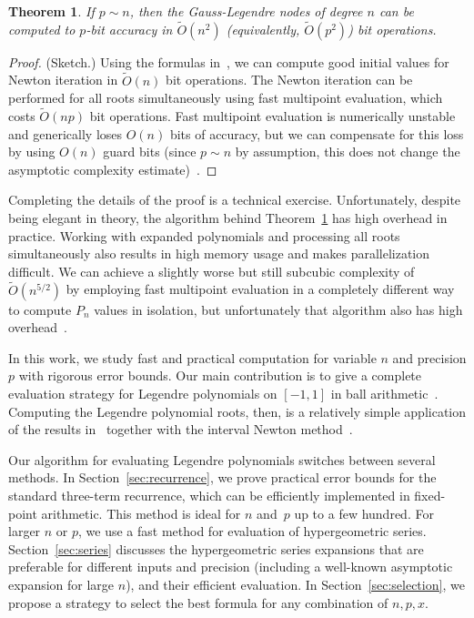 \documentclass[11pt,a4paper]{article}
\newtheorem{theorem}{Theorem}
\begin{document}
\begin{theorem}
\label{thm:complexity}
If $p \sim n$, then the Gauss-Legendre nodes of degree $n$ can be computed to
$p$-bit accuracy in $\widetilde{O}(n^2)$ (equivalently, $\widetilde{O}(p^2)$) bit operations.
\end{theorem}

\begin{proof}
(Sketch.)
Using the formulas in~\cite{petras1999computation},
we can compute good initial values for Newton iteration
in $\widetilde{O}(n)$ bit operations.
The Newton iteration can be performed for all roots
simultaneously using fast multipoint evaluation, which costs
$\widetilde{O}(n p)$ bit operations.
Fast multipoint evaluation is numerically unstable and
generically loses $O(n)$ bits of accuracy, but we can compensate for
this loss by using $O(n)$ guard bits
(since $p \sim n$ by assumption, this does not change the asymptotic complexity estimate)~\cite{kobel2013fast}.
\end{proof}

Completing the details
of the proof is a technical exercise.
Unfortunately, despite being elegant in theory,
the algorithm behind Theorem~\ref{thm:complexity} has high overhead
in practice. Working with expanded polynomials and
processing all roots simultaneously also results in high memory usage and
makes parallelization difficult.
We can achieve a slightly worse but still subcubic
complexity of $\widetilde{O}(n^{5/2})$
by employing
fast multipoint evaluation in a completely different way
to compute $P_n$ values in isolation,
but unfortunately that algorithm
also has high overhead~\cite{Johansson2014rectangular}.

In this work, we study fast and practical computation for variable $n$
and precision $p$ with rigorous error bounds.
Our main contribution is to give a complete evaluation strategy
for Legendre polynomials on $[-1,1]$ in ball arithmetic~\cite{vdH:ball,Johansson2017arb}.
Computing the Legendre polynomial roots, then,
is a relatively simple application of the results
in~\cite{petras1999computation} together with
the interval Newton method~\cite{moore1979methods}.

Our algorithm for evaluating Legendre polynomials switches between several methods.
In Section~\ref{sec:recurrence},
we prove practical error bounds for the standard three-term recurrence,
which can be efficiently implemented
in fixed-point arithmetic.
This method is ideal for $n$ and~$p$ up to a few hundred.
For larger $n$ or $p$, we use a fast method for evaluation
of hypergeometric series.
Section~\ref{sec:series} discusses the hypergeometric series
expansions that are preferable for different inputs and precision
(including a well-known asymptotic expansion for large $n$),
and their efficient evaluation.
In Section \ref{sec:selection}, we propose a strategy to select the
best formula for any combination of $n, p, x$.
\end{document}
